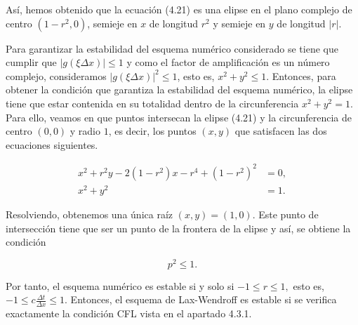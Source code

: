 \begin{example}
  Así, hemos obtenido que la ecuación (4.21) es una elipse en el plano
  complejo de centro $\left(1-r^2, 0\right)$, semieje en $x$ de
  longitud $r^{2}$ y semieje en $y$ de longitud $\left|r\right|$.

  Para garantizar la estabilidad del esquema numérico considerado se
  tiene que cumplir que
  \begin{math}
    \left|
    g
    \left(
    \xi\Delta x
    \right)
    \right|
    \leq
    1
  \end{math}
  y como el factor de amplificación es un número complejo,
  consideramos
  \begin{math}
    {\left|
      g
      \left(\xi\Delta x\right)
      \right|}^{2}\leq
    1
  \end{math},
  esto es,
  \begin{math}
    x^{2}+
    y^{2}\leq
    1
  \end{math}.
  Entonces, para obtener la condición que garantiza la estabilidad
  del esquema numérico, la elipse tiene que estar contenida en su
  totalidad dentro de la circunferencia $x^{2}+y^{2}=1$.
  Para ello, veamos en que puntos intersecan la elipse (4.21) y la
  circunferencia de centro $\left(0,0\right)$ y radio $1$, es decir,
  los puntos $\left(x,y\right)$ que satisfacen las dos ecuaciones
  siguientes.

  \begin{align*}
    x^{2}+
    r^{2}y-
    2\left(1-r^{2}\right)x-
    r^{4}+
    {\left(1-r^{2}\right)}^{2}
     & =
    0,   \\
    x^{2}+y^{2}
     & =
    1.
  \end{align*}

  Resolviendo, obtenemos una única raíz
  \begin{math}
    \left(x,y\right)=
    \left(1,0\right)
  \end{math}.
  Este punto de intersección tiene que ser un punto de la frontera de
  la elipse y así, se obtiene la condición

  \begin{equation*}
    p^{2}\leq
    1.
  \end{equation*}

  Por tanto, el esquema numérico es estable si y solo si
  \begin{math}
    -1\leq
    r\leq
    1,
  \end{math}
  esto es,
  \begin{math}
    -1\leq
    c\frac{\Delta t}{\Delta x}\leq
    1
  \end{math}.
  Entonces, el esquema de Lax-Wendroff es estable si se verifica
  exactamente la condición CFL vista en el apartado 4.3.1.
\end{example}